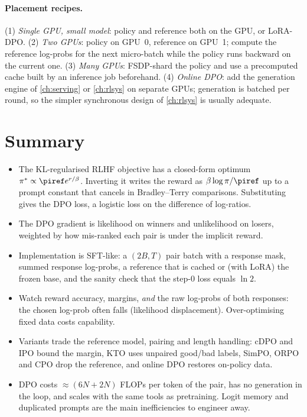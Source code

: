 \paragraph{Placement recipes.} (1) \emph{Single GPU, small model}: policy and reference both on the
GPU, or LoRA-DPO. (2) \emph{Two GPUs}: policy on GPU~0, reference on GPU~1; compute the reference
log-probs for the next micro-batch while the policy runs backward on the current one. (3)
\emph{Many GPUs}: FSDP-shard the policy and use a precomputed cache built by an inference job
beforehand. (4) \emph{Online DPO}: add the generation engine of \cref{ch:serving} or \cref{ch:rlsys}
on separate GPUs; generation is batched per round, so the simpler synchronous design of
\cref{ch:rlsys} is usually adequate.

\section{Summary}\label{sec:dpo:summary}
\begin{itemize}
\item The KL-regularised RLHF objective has a closed-form optimum $\pi^*\propto\piref e^{r/\beta}$.
  Inverting it writes the reward as $\beta\log\pi/\piref$ up to a prompt constant that cancels in
  Bradley--Terry comparisons. Substituting gives the DPO loss, a logistic loss on the difference
  of log-ratios.
\item The DPO gradient is likelihood on winners and unlikelihood on losers, weighted by how
  mis-ranked each pair is under the implicit reward.
\item Implementation is SFT-like: a $(2B,T)$ pair batch with a response mask, summed response
  log-probs, a reference that is cached or (with LoRA) the frozen base, and the sanity check that the
  step-0 loss equals $\ln 2$.
\item Watch reward accuracy, margins, \emph{and} the raw log-probs of both responses: the chosen
  log-prob often falls (likelihood displacement). Over-optimising fixed data costs capability.
\item Variants trade the reference model, pairing and length handling: cDPO and IPO bound the margin,
  KTO uses unpaired good/bad labels, SimPO, ORPO and CPO drop the reference, and online DPO restores
  on-policy data.
\item DPO costs $\approx(6N+2N)$ FLOPs per token of the pair, has no generation in the loop, and
  scales with the same tools as pretraining. Logit memory and duplicated prompts are the main
  inefficiencies to engineer away.
\end{itemize}


